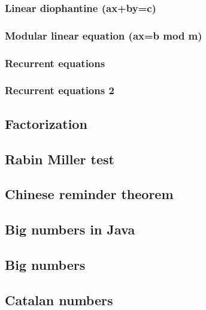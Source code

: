 \documentclass[a4paper]{article}
\begin{document}
\begin{multicols*}{2}
        \subsubsection{Linear diophantine (ax+by=c)}
            
        \subsubsection{Modular linear equation (ax=b mod m)}
            
        \subsubsection{Recurrent equations}
            
        \subsubsection{Recurrent equations 2}
            
    \subsection{Factorization}
        
    \subsection{Rabin Miller test}
        
    \subsection{Chinese reminder theorem}
        
    \subsection{Big numbers in Java}
        
    \subsection{Big numbers}
        
    \subsection{Catalan numbers}
        

\end{multicols*}
\end{document}
